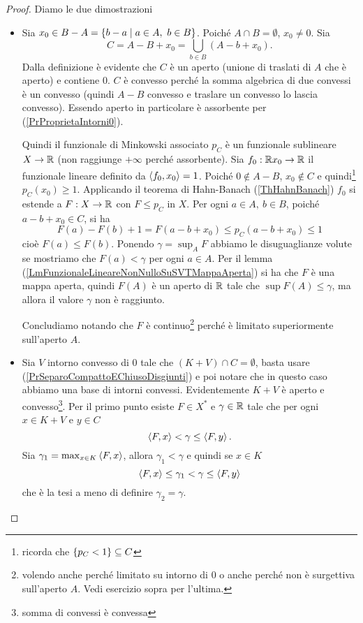 \begin{proof}
Diamo le due dimostrazioni
\setlength{\leftmargini}{0cm}
\begin{itemize}
    \item Sia $x_0\in B-A=\cpa{b-a\mid a\in A,\ b\in B}$. Poich\'e $A\cap B=\emptyset$, $x_0\neq 0$. Sia 
    \[C=A-B+x_0=\bigcup_{b\in B}(A-b+x_0).\]
    Dalla definizione \`e evidente che $C$ \`e un aperto (unione di traslati di $A$ che \`e aperto) e contiene $0$. $C$ \`e convesso perch\'e la somma algebrica di due convessi \`e un convesso (quindi $A-B$ convesso e traslare un convesso lo lascia convesso). Essendo aperto in particolare \`e assorbente per (\ref{PrProprietaIntorni0}).

    Quindi il funzionale di Minkowski associato $p_C$ \`e un funzionale sublineare $X\to \mathbb{R}$ (non raggiunge $+\infty$ perch\'e assorbente). Sia $f_0:\mathbb{R} x_0\to \mathbb{R}$ il funzionale lineare definito da $\left\langle {f_0,x_0}\right\rangle=1$. Poich\'e $0\notin A-B$, $x_0\notin C$ e quindi\footnote{ricorda che $\left\{{p_C<1}\right\}\subseteq C$} $p_C(x_0)\geq 1$. Applicando il teorema di Hahn-Banach (\ref{ThHahnBanach}) $f_0$ si estende a $F:X\to \mathbb{R}$ con $F\leq p_C$ in $X$. Per ogni $a\in A,\ b\in B$, poich\'e $a-b+x_0\in C$, si ha
    \[F(a)-F(b)+1=F(a-b+x_0)\leq p_C(a-b+x_0)\leq 1\]
    cio\`e $F(a)\leq F(b)$. Ponendo $\gamma=\sup_A F$ abbiamo le disuguaglianze volute se mostriamo che $F(a)<\gamma$ per ogni $a\in A$. Per il lemma (\ref{LmFunzionaleLineareNonNulloSuSVTMappaAperta}) si ha che $F$ \`e una mappa aperta, quindi $F(A)$ \`e un aperto di $\mathbb{R}$ tale che $\sup F(A)\leq \gamma$, ma allora il valore $\gamma$ non \`e raggiunto.


    Concludiamo notando che $F$ \`e continuo\footnote{volendo anche perch\'e limitato su intorno di $0$ o anche perch\'e non \`e surgettiva sull'aperto $A$. Vedi esercizio sopra per l'ultima.} perch\'e \`e limitato superiormente sull'aperto $A$.
    \item Sia $V$ intorno convesso di $0$ tale che $(K+V)\cap C=\emptyset$, basta usare (\ref{PrSeparoCompattoEChiusoDisgiunti}) e poi notare che in questo caso abbiamo una base di intorni convessi. Evidentemente $K+V$ \`e aperto e convesso\footnote{somma di convessi \`e convessa}. Per il primo punto esiste $F\in X^\ast$ e $\gamma\in\mathbb{R}$ tale che per ogni $x\in K+V$ e $y\in C$
    \[\left\langle {F,x}\right\rangle<\gamma\leq \left\langle {F,y}\right\rangle.\]
    Sia $\gamma_1=\max_{x\in K}\left\langle {F,x}\right\rangle$, allora $\gamma_1<\gamma$ e quindi se $x\in K$
    \[\left\langle {F,x}\right\rangle\leq \gamma_1<\gamma\leq \left\langle {F,y}\right\rangle\]
    che \`e la tesi a meno di definire $\gamma_2=\gamma$.
\end{itemize}
\setlength{\leftmargini}{0.5cm}
\end{proof}




